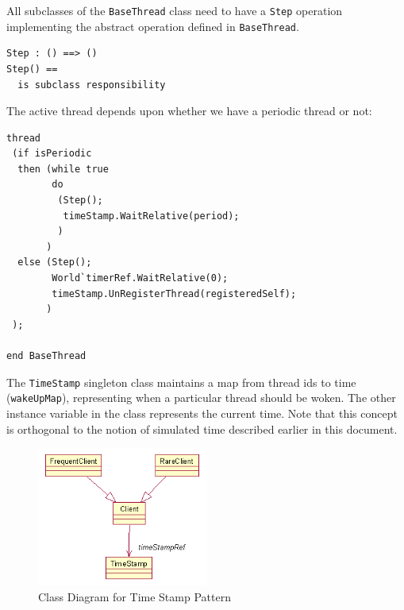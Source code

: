 \documentclass{overturerepchap}
\begin{document}
All subclasses of the \texttt{BaseThread} class need to have a \texttt{Step}
operation implementing the abstract operation defined in \texttt{BaseThread}.

\begin{lstlisting}
Step : () ==> ()
Step() ==
  is subclass responsibility
\end{lstlisting}

The active thread depends upon whether we have a periodic thread or not:

\begin{lstlisting}
thread
 (if isPeriodic
  then (while true
        do 
         (Step();
          timeStamp.WaitRelative(period);
         )
       )
  else (Step();
        World`timerRef.WaitRelative(0);
        timeStamp.UnRegisterThread(registeredSelf);
       )
 );

end BaseThread
\end{lstlisting}

The \texttt{TimeStamp} singleton class maintains a map from thread ids to 
time (\texttt{wakeUpMap}), representing when a particular thread 
should be woken. The other instance variable in the class
represents the current time. Note that this concept is orthogonal to
the notion of simulated time described earlier in this document.

\begin{figure}
\begin{center}
\includegraphics[width=0.5\textwidth]{figures/timestamp.png}
\end{center}
\caption{Class Diagram for Time Stamp Pattern\label{fig:classtimestamp}}
\end{figure}

\end{document}
